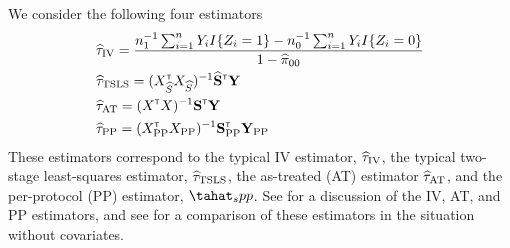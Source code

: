 \documentclass{article}
\def\siv{_{\text{IV}}}
\def\spp{_{\text{PP}}}
\def\sat{_{\text{AT}}}
\def\stsls{_{\text{TSLS}}}
\def\xpp{X\spp}
\begin{document}
We consider the following four estimators
\begin{align}
    &\tauhat\siv = \frac{n_1\inv\sum_{i=1}^nY_iI\{Z_i = 1\} - n_0\inv\sum_{i=1}^nY_iI\{Z_i = 0\}}{1 - \pihat_{00}} \label{iv_est} \\
    &\tauhat\stsls = (X_\Shat\trans X_\Shat)\inv \bShat\trans \bY  \label{tsls_est}\\
    &\tauhat\sat = (X\trans X)\inv \bS\trans \bY \label{at_est}\\
    &\tauhat\spp = (\xpp\trans\xpp)\inv \bS\spp\trans \bY\spp\label{pp_est}
\end{align}
These estimators correspond to the typical IV estimator, $\tauhat\siv$, the typical two-stage least-squares estimator, $\tauhat\stsls$, the as-treated (AT) estimator $\tauhat\sat$, and the per-protocol (PP) estimator, $\tahat_spp$. See \cite{Little2018} for a discussion of the IV, AT, and PP estimators, and see \cite{antonelli2017synthetic} for a comparison of these estimators in the situation without covariates. 



\end{document}
